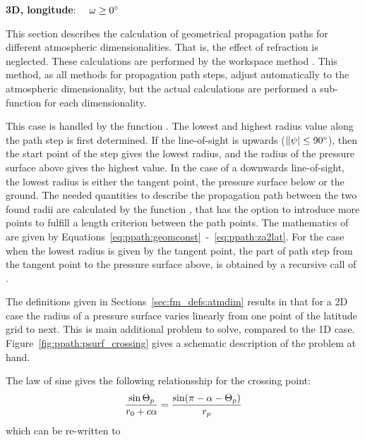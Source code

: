  {\bf 3D, longitude}: $\quad \omega \geq 0^\circ$



\label{sec:ppath:stepcalc}

This section describes the calculation of geometrical propagation
paths for different atmospheric dimensionalities. That is, the effect
of refraction is neglected. These calculations are performed by the
workspace method . This method, as all
methods for propagation path steps, adjust automatically to the
atmospheric dimensionality, but the actual calculations are performed
a sub-function for each dimensionality.


\label{sec:ppath:1Dgeom}

This case is handled by the function
.  The lowest and highest radius
value along the path step is first determined. If the line-of-sight is
upwards ($\|\psi| \leq 90^\circ$), then the start point of
the step gives the lowest radius, and the radius of the pressure
surface above gives the highest value. In the case of a downwards
line-of-sight, the lowest radius is either the tangent
point, the pressure surface below or the ground. The needed quantities
to describe the propagation path between the two found radii are
calculated by the function ,
that has the option to introduce more points to fulfill a length
criterion between the path points.  The mathematics of
 are given by
Equations~\ref{eq:ppath:geomconst}~-~\ref{eq:ppath:za2lat}.
For the case when the lowest radius is given by the tangent point, the
part of path step from the tangent point to the pressure surface
above, is obtained by a recursive call of
.


\label{sec:ppath:2Dgeom}

The definitions given in Sections~\ref{sec:fm_defs:atmdim} results in
that for a 2D case the radius of a pressure surface varies linearly
from one point of the latitude grid to next. This is main additional
problem to solve, compared to the 1D case.
Figure~\ref{fig:ppath:psurf_crossing} gives a schematic description of
the problem at hand.

The law of sine gives the following relationsship for the crossing
point:
\begin{equation}
  \frac{\sin\Theta_p}{r_{0}+c\alpha} = 
                                \frac{\sin(\pi-\alpha-\Theta_p)}{r_{p}}
\end{equation}
which can be re-written to

